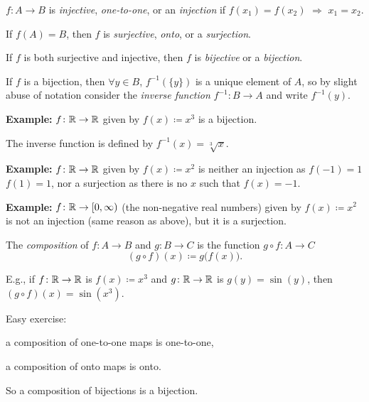 \documentclass[10pt,aspectratio=169]{beamer}
\begin{document}
\begin{frame}
\begin{definition}
$f \colon A \to B$ is
\emph{injective}, \emph{one-to-one}, or an \emph{injection}
if $f(x_1) = f(x_2)$ $\Rightarrow$ $x_1 = x_2$.


\pause
\medskip

If $f(A) = B$, then $f$ is
\emph{surjective},
\emph{onto}, or a \emph{surjection}.


\pause
\medskip
If $f$ is both surjective and injective, then
$f$ is \emph{bijective} or a \emph{bijection}.

\pause
\medskip

If $f$ is a bijection, then $\forall y \in B$, $f^{-1}(\{y\})$ is a unique element of $A$,
so by slight abuse of notation
consider
the \emph{inverse function}
$f^{-1} \colon B \to A$
and write $f^{-1}(y)$.
\end{definition}

\pause
\textbf{Example:}
$f \colon {\mathbb{R}} \to {\mathbb{R}}$ given by $f(x) \coloneqq
x^3$ is a bijection.

\pause
The inverse function is defined by $f^{-1}(x) = \sqrt[3]{x}$.

\medskip
\pause
\textbf{Example:}
$f \colon {\mathbb{R}} \to {\mathbb{R}}$ given by $f(x) \coloneqq
x^2$ is neither an injection as $f(-1) = 1$  $f(1)=1$,
nor a surjection as there is no $x$ such that $f(x) = -1$.

\medskip
\pause
\textbf{Example:}
$f \colon {\mathbb{R}} \to [0,\infty)$ (the non-negative
real numbers) given by $f(x) \coloneqq x^2$ is not an injection (same reason as
above), but 
it is a surjection.

\end{frame}

\begin{frame}
\begin{definition}
The \emph{composition} of $f \colon A \to B$ and $g \colon B \to C$ is
the function
$g \circ f \colon A \to C$
\[
(g \circ f)(x) \coloneqq g\bigl(f(x)\bigr) .
\]
\end{definition}

\pause

E.g., if $f \colon {\mathbb{R}} \to {\mathbb{R}}$ is $f(x)\coloneqq x^3$ and $g \colon {\mathbb{R}} \to {\mathbb{R}}$
is $g(y) = \sin(y)$,
\pause
then $(g \circ f)(x) = \sin(x^3)$.

\medskip
\pause

Easy exercise:

\pause
a composition of one-to-one maps is one-to-one,

\pause
a composition of onto maps is onto.

\pause
So a composition of bijections is a bijection.
\end{frame}
\end{document}
